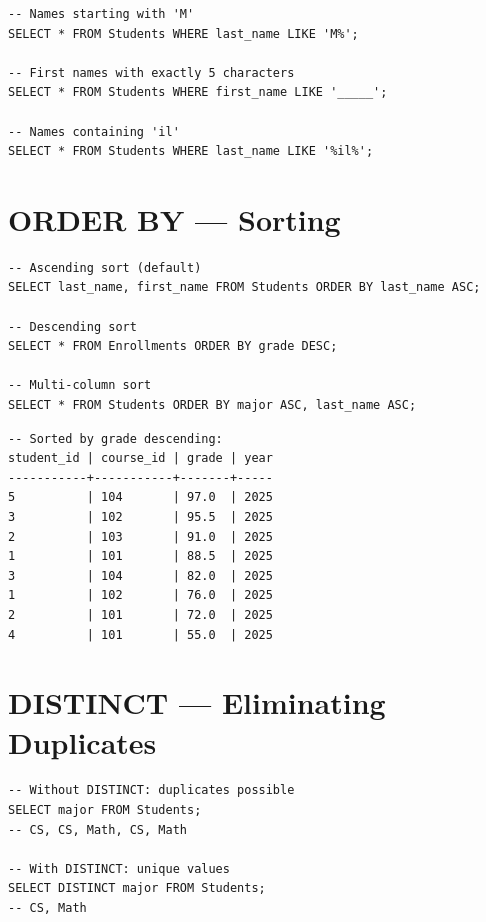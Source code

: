 \begin{codeblock}[title=\textbf{LIKE Examples}]
\begin{verbatim}
-- Names starting with 'M'
SELECT * FROM Students WHERE last_name LIKE 'M%';

-- First names with exactly 5 characters
SELECT * FROM Students WHERE first_name LIKE '_____';

-- Names containing 'il'
SELECT * FROM Students WHERE last_name LIKE '%il%';
\end{verbatim}
\end{codeblock}

\section{ORDER BY --- Sorting}

\begin{codeblock}[title=\textbf{Sorting Results}]
\begin{verbatim}
-- Ascending sort (default)
SELECT last_name, first_name FROM Students ORDER BY last_name ASC;

-- Descending sort
SELECT * FROM Enrollments ORDER BY grade DESC;

-- Multi-column sort
SELECT * FROM Students ORDER BY major ASC, last_name ASC;
\end{verbatim}
\end{codeblock}

\begin{codeoutput}
\begin{verbatim}
-- Sorted by grade descending:
student_id | course_id | grade | year
-----------+-----------+-------+-----
5          | 104       | 97.0  | 2025
3          | 102       | 95.5  | 2025
2          | 103       | 91.0  | 2025
1          | 101       | 88.5  | 2025
3          | 104       | 82.0  | 2025
1          | 102       | 76.0  | 2025
2          | 101       | 72.0  | 2025
4          | 101       | 55.0  | 2025
\end{verbatim}
\end{codeoutput}

\section{DISTINCT --- Eliminating Duplicates}

\begin{codeblock}[title=\textbf{Using DISTINCT}]
\begin{verbatim}
-- Without DISTINCT: duplicates possible
SELECT major FROM Students;
-- CS, CS, Math, CS, Math

-- With DISTINCT: unique values
SELECT DISTINCT major FROM Students;
-- CS, Math
\end{verbatim}
\end{codeblock}

